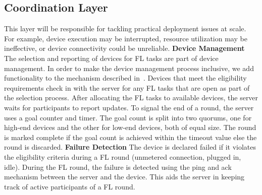     \subsection{Coordination Layer}
        This layer will be responsible for tackling practical deployment issues at scale. For example, device execution may be interrupted, resource utilization may be ineffective, or device connectivity could be unreliable. \newline \newline
        \textbf{Device Management} The selection and reporting of devices for FL tasks are part of device management. In order to make the device management process inclusive, we add functionality to the mechanism described in~\cite{DBLP:journals/corr/abs-1902-01046}. Devices that meet the eligibility requirements check in with the server for any FL tasks that are open as part of the selection process. After allocating the FL tasks to available devices, the server waits for participants to report updates. To signal the end of a round, the server uses a goal counter and timer. The goal count is split into two quorums, one for high-end devices and the other for low-end devices, both of equal size. The round is marked complete if the goal count is achieved within the timeout value else the round is discarded. 
        \newline \newline
        \textbf{Failure Detection} The device is declared failed if it violates the eligibility criteria during a FL round (unmetered connection, plugged in, idle). During the FL round, the failure is detected using the ping and ack mechanism between the server and the device. This aids the server in keeping track of active participants of a FL round.

